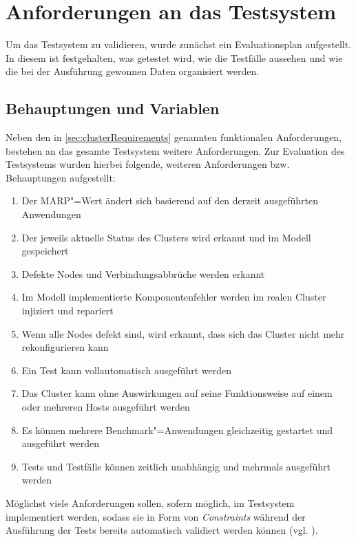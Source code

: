 \section{Anforderungen an das Testsystem}
\label{sec:evaluationPlan}

Um das Testsystem zu validieren, wurde zunächst ein Evaluationsplan aufgestellt.
In diesem ist festgehalten, was getestet wird, wie die Testfälle aussehen und wie die bei der Ausführung gewonnen Daten organisiert werden.

\subsection{Behauptungen und Variablen}
\label{sec:predictions}

Neben den in \autoref{sec:clusterRequirements} genannten funktionalen Anforderungen, bestehen an das gesamte Testsystem weitere Anforderungen.
Zur Evaluation des Testsystems wurden hierbei folgende, weiteren Anforderungen bzw. Behauptungen aufgestellt:

\begin{enumerate}
    \item Der \ac{MARP}"=Wert ändert sich basierend auf den derzeit ausgeführten Anwendungen
    \item Der jeweils aktuelle Status des Clusters wird erkannt und im Modell gespeichert
    \item Defekte Nodes und Verbindungsabbrüche werden erkannt
    \item Im Modell implementierte Komponentenfehler werden im realen Cluster injiziert und repariert
    \item Wenn alle Nodes defekt sind, wird erkannt, dass sich das Cluster nicht mehr rekonfigurieren kann
    \item Ein Test kann vollautomatisch ausgeführt werden
    \item Das Cluster kann ohne Auswirkungen auf seine Funktionsweise auf einem oder mehreren Hosts ausgeführt werden
    \item Es können mehrere Benchmark"=Anwendungen gleichzeitig gestartet und ausgeführt werden
    \item Tests und Testfälle können zeitlich unabhängig und mehrmals ausgeführt werden
\end{enumerate}

Möglichst viele Anforderungen sollen, sofern möglich, im Testsystem implementiert werden, sodass sie in Form von \emph{Constraints} während der Ausführung der Tests bereits automatisch validiert werden können (vgl. ).

